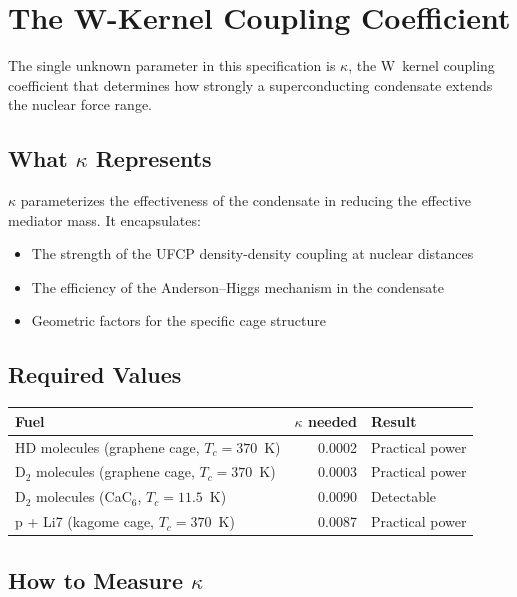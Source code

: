 \documentclass[11pt, a4paper]{article}
\begin{document}
\section{The W-Kernel Coupling Coefficient}

The single unknown parameter in this specification is $\kappa$,
the W~kernel coupling coefficient that determines how strongly
a superconducting condensate extends the nuclear force range.

\subsection{What $\kappa$ Represents}

$\kappa$ parameterizes the effectiveness of the condensate in
reducing the effective mediator mass. It encapsulates:
\begin{itemize}[nosep]
  \item The strength of the UFCP density-density coupling at
        nuclear distances
  \item The efficiency of the Anderson--Higgs mechanism in the
        condensate
  \item Geometric factors for the specific cage structure
\end{itemize}

\subsection{Required Values}

\begin{center}
\begin{tabular}{@{}lrl@{}}
\toprule
\textbf{Fuel} & \textbf{$\kappa$ needed} & \textbf{Result} \\
\midrule
HD molecules (graphene cage, $T_c = 370$~K) & 0.0002 & Practical power \\
D$_2$ molecules (graphene cage, $T_c = 370$~K) & 0.0003 & Practical power \\
D$_2$ molecules (CaC$_6$, $T_c = 11.5$~K) & 0.0090 & Detectable \\
p + Li7 (kagome cage, $T_c = 370$~K) & 0.0087 & Practical power \\
\bottomrule
\end{tabular}
\end{center}

\subsection{How to Measure $\kappa$}
\end{document}
